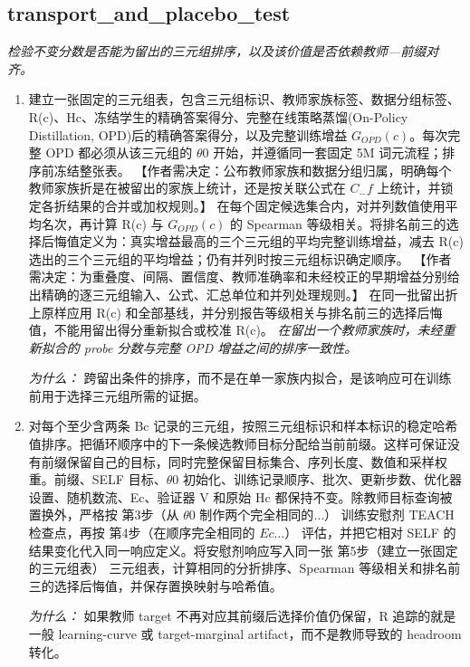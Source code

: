 \documentclass[10pt,a4paper]{article}
\begin{document}
\subsection*{transport\_and\_placebo\_test}
\emph{检验不变分数是否能为留出的三元组排序，以及该价值是否依赖教师---前缀对齐。}
\begin{enumerate}[leftmargin=*,start=5]
  \item 建立一张固定的三元组表，包含三元组标识、教师家族标签、数据分组标签、R(c)、Hc、冻结学生的精确答案得分、完整在线策略蒸馏(On-Policy Distillation, OPD)后的精确答案得分，以及完整训练增益 \(G_{OPD}(c)\)。每次完整 OPD 都必须从该三元组的 \(\theta 0\) 开始，并遵循同一套固定 5M 词元流程；排序前冻结整张表。 【作者需决定：公布教师家族和数据分组归属，明确每个教师家族折是在被留出的家族上统计，还是按关联公式在 \(C_-f\) 上统计，并锁定各折结果的合并或加权规则。】 在每个固定候选集合内，对并列数值使用平均名次，再计算 R(c) 与 \(G_{OPD}(c)\) 的 Spearman 等级相关。将排名前三的选择后悔值定义为：真实增益最高的三个三元组的平均完整训练增益，减去 R(c) 选出的三个三元组的平均增益；仍有并列时按三元组标识确定顺序。 【作者需决定：为重叠度、间隔、置信度、教师准确率和未经校正的早期增益分别给出精确的逐三元组输入、公式、汇总单位和并列处理规则。】 在同一批留出折上原样应用 R(c) 和全部基线，并分别报告等级相关与排名前三的选择后悔值，不能用留出得分重新拟合或校准 R(c)。
\noindent\emph{在留出一个教师家族时，未经重新拟合的 probe 分数与完整 OPD 增益之间的排序一致性。}
\par{}
\par\emph{为什么：} 跨留出条件的排序，而不是在单一家族内拟合，是该响应可在训练前用于选择三元组所需的证据。
  \item 对每个至少含两条 Bc 记录的三元组，按照三元组标识和样本标识的稳定哈希值排序。把循环顺序中的下一条候选教师目标分配给当前前缀。这样可保证没有前缀保留自己的目标，同时完整保留目标集合、序列长度、数值和采样权重。前缀、SELF 目标、\(\theta 0\) 初始化、训练记录顺序、批次、更新步数、优化器设置、随机数流、Ec、验证器 V 和原始 Hc 都保持不变。除教师目标查询被置换外，严格按 第3步（从 \(\theta 0\) 制作两个完全相同的\(\dots \)） 训练安慰剂 TEACH 检查点，再按 第4步（在顺序完全相同的 \(Ec\dots \)） 评估，并把它相对 SELF 的结果变化代入同一响应定义。将安慰剂响应写入同一张 第5步（建立一张固定的三元组表） 三元组表，计算相同的分折排序、Spearman 等级相关和排名前三的选择后悔值，并保存置换映射与哈希值。
\par\emph{为什么：} 如果教师 target 不再对应其前缀后选择价值仍保留，R 追踪的就是一般 learning-curve 或 target-marginal artifact，而不是教师导致的 headroom 转化。
\end{enumerate}
\end{document}
